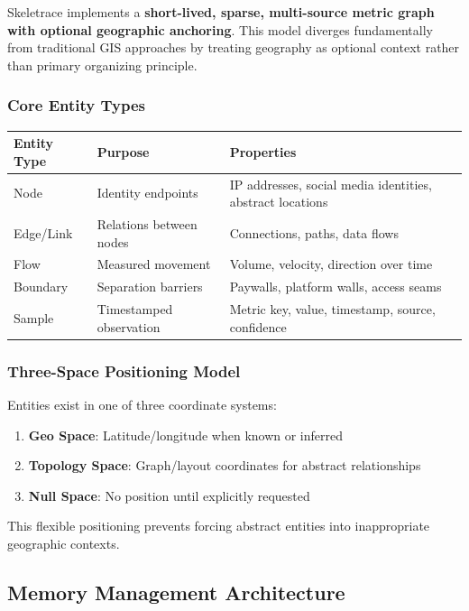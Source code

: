 \documentclass[12pt,a4paper]{article}
\begin{document}
Skeletrace implements a \textbf{short-lived, sparse, multi-source metric graph with optional geographic anchoring}. This model diverges fundamentally from traditional GIS approaches by treating geography as optional context rather than primary organizing principle.

\subsubsection{Core Entity Types}

\begin{longtable}{|p{3cm}|p{4cm}|p{8cm}|}
\hline
\textbf{Entity Type} & \textbf{Purpose} & \textbf{Properties} \\
\hline
\endhead
Node & Identity endpoints & IP addresses, social media identities, abstract locations \\
\hline
Edge/Link & Relations between nodes & Connections, paths, data flows \\
\hline
Flow & Measured movement & Volume, velocity, direction over time \\
\hline
Boundary & Separation barriers & Paywalls, platform walls, access seams \\
\hline
Sample & Timestamped observation & Metric key, value, timestamp, source, confidence \\
\hline
\end{longtable}

\subsubsection{Three-Space Positioning Model}
Entities exist in one of three coordinate systems:

\begin{enumerate}
\item \textbf{Geo Space}: Latitude/longitude when known or inferred
\item \textbf{Topology Space}: Graph/layout coordinates for abstract relationships
\item \textbf{Null Space}: No position until explicitly requested
\end{enumerate}

This flexible positioning prevents forcing abstract entities into inappropriate geographic contexts.

\subsection{Memory Management Architecture}
\end{document}
